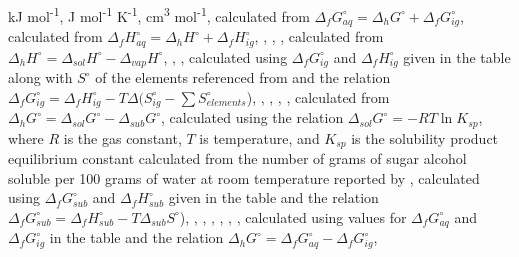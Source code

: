 \begin{landscape}
\begin{table}
\begin{adjustbox}{width=600pt,keepaspectratio}
\begin{threeparttable}
  
  \begin{tablenotes}
     kJ mol\textsuperscript{-1},
     J mol\textsuperscript{-1} K\textsuperscript{-1},
     cm\textsuperscript{3} mol\textsuperscript{-1},
     calculated from $\Delta_{f}G^{\circ}_{aq} = \Delta_{h}G^{\circ} + \Delta_{f}G^{\circ}_{ig}$,
     calculated from $\Delta_{f}H^{\circ}_{aq} = \Delta_{h}H^{\circ} + \Delta_{f}H^{\circ}_{ig}$,
     \cite{lian1982polyol},
     \cite{dipaola1977polyol},
     \cite{plyasunov2006corresponding},
     calculated from $\Delta_{h}H^{\circ} = \Delta_{sol}H^{\circ} - \Delta_{vap}H^{\circ}$,
     \cite{nichols1976thermochemistry},
     \cite{verevkin2004determination},
     calculated using $\Delta_{f}G^{\circ}_{ig}$ and $\Delta_{f}H^{\circ}_{ig}$ given in the table along with $S^{\circ}$ of the elements referenced from \cite{cox1989codata} and the relation $\Delta_{f}G^{\circ}_{ig} = \Delta_{f}H^{\circ}_{ig} - T\Delta(S_{ig}^{\circ}-\sum S_{elements}^{\circ}$),
     \cite{verevkin20091},
     \cite{chao1986thermodynamic},
     \cite{bastos1988thermodynamic},
     \cite{verevkin2015thermodynamic},
     calculated from $\Delta_{h}G^{\circ} = \Delta_{sol}G^{\circ} - \Delta_{sub}G^{\circ}$,
     calculated using the relation $\Delta_{sol}G^{\circ} = -RT\ln{K_{sp}}$, where $R$ is the gas constant, $T$ is temperature, and $K_{sp}$ is the solubility product equilibrium constant calculated from the number of grams of sugar alcohol soluble per 100 grams of water at room temperature reported by \cite{dehn1917comparative},
     calculated using $\Delta_{f}G^{\circ}_{sub}$ and $\Delta_{f}H^{\circ}_{sub}$ given in the table and the relation $\Delta_{f}G^{\circ}_{sub} = \Delta_{f}H^{\circ}_{sub} - T\Delta_{sub}S^{\circ}$),
     \cite{lopes2006determination},
     \cite{barone1990enthalpies},
     \cite{chavez1997hydrostatic},
     \cite{da2013thermochemistry},
     \cite{wang2013measurement},
     \cite{tewari1996thermodynamics},
     calculated using values for $\Delta_{f}G_{aq}^{\circ}$ and $\Delta_{f}G_{ig}^{\circ}$ in the table and the relation $\Delta_{h}G^{\circ} = \Delta_{f}G_{aq}^{\circ} - \Delta_{f}G_{ig}^{\circ}$,
     \cite{yaws1997handbook}
        

\end{tablenotes}
\end{threeparttable}
\end{adjustbox}
\end{table}
\end{landscape}
